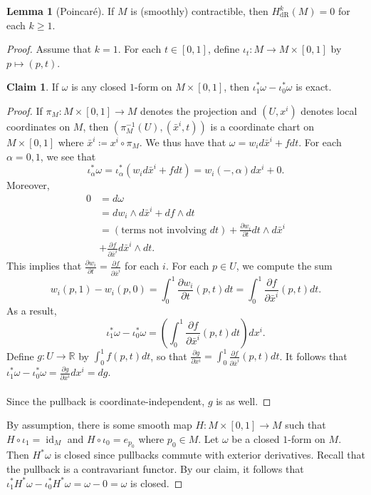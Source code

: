 \documentclass[10pt,letterpaper,cm]{nupset}
\theoremstyle{definition}
\theoremstyle{theorem}
\newtheorem{lemma}[definition]{Lemma}
\newtheorem*{claim}{Claim}
\theoremstyle{remark}
\newcommand{\R}{\mathbb R}
\newcommand{\1}{\mathbf{1}}
\newcommand{\0}{\vec 0}
\DeclareMathOperator{\id}{id}
\DeclareMathOperator{\dr}{dR}
\begin{document}
\begin{lemma}[Poincar\'e]
If $M$ is (smoothly) contractible, then $H_{\dr}^k(M) = 0$ for each $k\geq 1$.
\end{lemma}
\begin{proof}
Assume that $k=1$. For each $t\in [0,1]$, define $\iota_t : M \to M \times [0,1]$ by $p\mapsto (p, t)$.
\begin{claim} If $\omega$ is any closed $1$-form  on $M\times [0,1]$, then $\iota^{\ast}_1\omega -\iota^{\ast}_0\omega$ is exact. \end{claim}
\begin{proof} If $\pi_M : M \times [0,1] \to M$ denotes the projection and $(U, x^i)$ denotes local coordinates on $M$, then $(\pi_M^{-1}(U), (\bar{x}^i, t))$ is a coordinate chart on $M \times [0,1]$ where $\bar{x}^i \coloneqq  x^i \circ \pi_M$. We thus have that $\omega = w_id\bar{x}^i+ f dt$. For each $\alpha =0,1$, we see that $$ \iota^{\ast}_{\alpha}\omega = \iota^{\ast}_{\alpha}(w_id\bar{x}^i +fdt)=w_i(-, \alpha)dx^i +0  .$$ Moreover, 
\begin{align*}  0 & =d\omega
\\ &  =dw_i \wedge d\bar{x}^i +df \wedge dt \\ & = (\text{terms not involving }dt) +\frac{\partial{w_i}}{\partial{t}}dt \wedge d\bar{x}^i 
\\ & +\frac{\partial{f}}{\partial{\bar{x}^i}}d\bar{x}^i\wedge dt  . \end{align*}
This implies that $\frac{\partial{w_i}}{\partial{t}} = \frac{\partial{f}}{\partial{\bar{x}^i}}$ for each $i$. For each $p\in U$, we compute the sum 
$$ w_i(p, 1) -w_i(p,0) = \int_0^1  \frac{\partial{w_i}}{\partial{t}}(p, t)dt =  \int_0^1 \frac{\partial{f}}{\partial{\bar{x}^i}}(p,t)dt .$$ As a result, $$\iota^{\ast}_1 \omega -\iota^{\ast}_0 \omega =  \left( \int_0^1 \frac{\partial{f}}{\partial{\bar{x}^i}}(p,t)dt \right)dx^i .$$ Define $g: U \to \R$ by $\int_0^1f(p,t)dt$, so that $\frac{\partial{g}}{\partial{x^i}} = \int_0^1\frac{\partial{f}}{\partial{\bar{x}^i}}(p,t)dt$. It follows that $\iota^{\ast}_1 \omega -\iota^{\ast}_0 \omega  = \frac{\partial{g}}{\partial{x^i}}dx^i = dg.$
\\ \\ Since the pullback is coordinate-independent, $g$ is as well.
\end{proof}
By assumption, there is some smooth map $H: M \times [0,1] \to M$ such that $H \circ \iota_1 =\id_M$ and $H \circ \iota_0 = e_{p_0}$ where $p_0 \in M$. Let $\omega$ be a closed $1$-form  on $M$. Then $H^{\ast} \omega$ is closed since pullbacks commute with exterior derivatives. Recall that the pullback is a contravariant functor. By our claim, it follows that $\iota^{\ast}_1H^{\ast}\omega - \iota^{\ast}_0 H^{\ast}\omega = \omega -0 = \omega$ is closed.

\end{proof}
\end{document}
